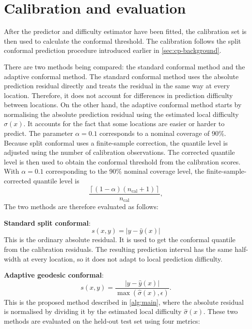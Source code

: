 \section{Calibration and evaluation}
\label{sec:calibration_evaluation}

After the predictor and difficulty estimator have been fitted, the calibration set is then used to calculate the conformal threshold. The calibration follows the split conformal prediction procedure introduced earlier in \cref{sec:cp-background}.

There are two methods being compared: the standard conformal method and the adaptive conformal method. The standard conformal method uses the absolute prediction residual directly and treats the residual in the same way at every location. Therefore, it does not account for differences in prediction difficulty between locations. On the other hand, the adaptive conformal method starts by normalising the absolute prediction residual using the estimated local difficulty $\hat{\sigma}(x)$. It accounts for the fact that some locations are easier or harder to predict. The parameter $\alpha=0.1$ corresponds to a nominal coverage of 90\%. Because split conformal uses a finite-sample correction, the quantile level is adjusted using the number of calibration observations. The corrected quantile level is then used to obtain the conformal threshold from the calibration scores. With $\alpha=0.1$ corresponding to the 90\% nominal coverage level, the finite-sample-corrected quantile level is
\begin{equation}
\frac{\left\lceil(1-\alpha)(n_{\mathrm{cal}}+1)\right\rceil}
{n_{\mathrm{cal}}},
\end{equation}
The two methods are therefore evaluated as follows:

\textbf{Standard split conformal}:  
 \begin{equation}
s(x,y)=|y-\hat y(x)|
\end{equation}
This is the ordinary absolute residual. It is used to get the conformal quantile from the calibration residuals. The resulting prediction interval has the same half-width at every location, so it does not adapt to local prediction difficulty. 

\textbf{Adaptive geodesic conformal}: 
\begin{equation}
s(x,y)
=
\frac{|y-\hat{y}(x)|}
{\max\left(\hat{\sigma}(x),\epsilon\right)}.
\end{equation}
This is the proposed method described in \cref{alg:main}, where the absolute residual is normalised by dividing it by the estimated local difficulty $\hat\sigma(x)$. These two methods are evaluated on the held-out test set using four metrics:

